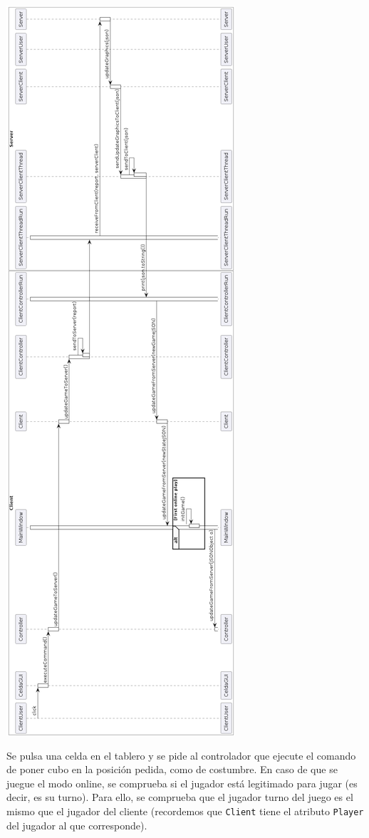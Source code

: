 \documentclass[12pt,a4paper,openright]{book}
\theoremstyle{break}
\begin{document}
\begin{center}
\includegraphics[scale=0.4]{juegoTipicoUmlSprint7.png}
\end{center}

Se pulsa una celda en el tablero y se pide al controlador que ejecute el comando de poner cubo en la posición pedida, como de costumbre. En caso de que se juegue el modo online, se comprueba si el jugador está legitimado para jugar (es decir, es su turno). Para ello, se comprueba que el jugador turno del juego es el mismo que el jugador del cliente (recordemos que \texttt{Client} tiene el atributo \texttt{Player} del jugador al que corresponde).
\end{document}
